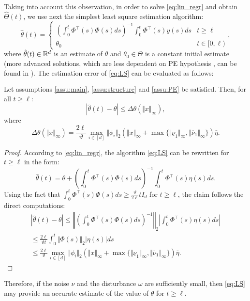 \documentclass[letterpaper, 10 pt, conference]{ieeeconf}  %
\begin{document}
Taking into account this observation, in order to solve \eqref{eq:lin_regr}
and obtain $\hat{\Theta}(t)$, we use next the simplest least
square estimation algorithm:
\begin{equation}
\hat{\theta}(t)=\begin{cases}
\left(\int_{0}^{t}\Phi^{\top}(s)\Phi(s)ds\right)^{-1}\int_{0}^{t}\Phi^{\top}(s)y(s)ds & t\geq\ell\\
\theta_{0} & t\in[0,\ell)
\end{cases},\label{eq:LS}
\end{equation}
where $\hat{\theta}(t)\in\mathbb{R}^{d}$ is an estimate of $\theta$ and
$\theta_{0}\in\Theta$ is a constant initial estimate (more advanced
solutions, which are less dependent on PE hypothesis \cite{Efimov2015,Efimov_PE2018},
can be found in \cite{Chowdhary2012,Wang2019a}). The estimation error
of \eqref{eq:LS} can be evaluated as follows: 
\begin{proposition}
\label{prop:LS} Let assumptions \ref{assu:main}, \ref{assu:structure}
and \ref{assu:PE} be satisfied. Then, for all $t\geq\ell$:
\[
|\hat{\theta}(t)-\theta|\leq\Delta\theta(\Vert x\Vert_{\infty}),
\]
where
\[
\Delta\theta(\Vert x\Vert_{\infty})=\frac{2\ell}{\vartheta}\max_{i\in[d]}\Vert\phi_{i}\Vert_{2}(\Vert x\Vert_{\infty}+\max\{\Vert\underline{\nu}_{1}\Vert_{\infty},\Vert\overline{\nu}_{1}\Vert_{\infty}\})\bar{\eta}.
\]
\end{proposition}
\begin{proof}
According to \eqref{eq:lin_regr}, the algorithm \eqref{eq:LS} can
be rewritten for $t\geq\ell$ in the form:
\[
\hat{\theta}(t)=\theta+\left(\int_{0}^{t}\Phi^{\top}(s)\Phi(s)ds\right)^{-1}\int_{0}^{t}\Phi^{\top}(s)\eta(s)ds.
\]
Using the fact that $\int_{0}^{t}\Phi^{\top}(s)\Phi(s)ds\geq\frac{\vartheta}{2\ell}tI_{d}$
for $t\geq\ell$, the claim follows the direct computations:
\begin{gather*}
|\hat{\theta}(t)-\theta|\leq\left\Vert \left(\int_{0}^{t}\Phi^{\top}(s)\Phi(s)ds\right)^{-1}\right\Vert _{2}\left|\int_{0}^{t}\Phi^{\top}(s)\eta(s)ds\right|\\
\leq\frac{2\ell}{\vartheta t}\int_{0}^{t}\Vert\Phi(s)\Vert_{2}|\eta(s)|ds\\
\leq\frac{2\ell}{\vartheta}\max_{i\in[d]}\Vert\phi_{i}\Vert_{2}(\Vert x\Vert_{\infty}+\max\{\Vert\underline{\nu}_{1}\Vert_{\infty},\Vert\overline{\nu}_{1}\Vert_{\infty}\})\bar{\eta}.
\end{gather*}
\end{proof}
Therefore, if the noise $\nu$ and the disturbance $\omega$ are sufficiently
small, then \eqref{eq:LS} may provide an accurate estimate of the
value of $\theta$ for $t\geq\ell$.
\end{document}
